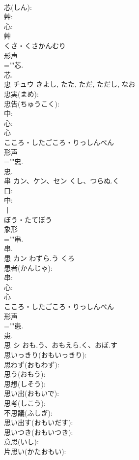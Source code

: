 \documentclass[8pt]{extreport}
\begin{document}
\begin{CJK}{UTF8}{min}
\\	芯(しん): 
\\	艸: 
\\	心: 
\\	艸	
\\	くさ・くさかんむり	
\\	形声 
\\	=""芯.
\\	芯.
\\	忠	チュウ		きよし, たた, ただ, ただし, なお	
\\	忠実(まめ): 
\\	忠告(ちゅうこく): 
\\	中: 
\\	心: 
\\	心	
\\	こころ・したごころ・りっしんべん	
\\	形声 
\\	=""忠.
\\	忠.
\\	串	カン、ケン、セン	くし、つらぬ.く		
\\	口: 
\\	中: 
\\	丨	
\\	ぼう・たてぼう	
\\	象形 
\\	=""串.
\\	串.
\\	患	カン	わずら.う	くろ	
\\	患者(かんじゃ): 
\\	串: 
\\	心: 
\\	心	
\\	こころ・したごころ・りっしんべん	
\\	形声 
\\	=""患.
\\	患.
\\	思	シ	おも.う、おもえら.く、おぼ.す		
\\	思いっきり(おもいっきり): 
\\	思わず(おもわず): 
\\	思う(おもう): 
\\	思想(しそう): 
\\	思い出(おもいで): 
\\	思考(しこう): 
\\	不思議(ふしぎ): 
\\	思い出す(おもいだす): 
\\	思いつき(おもいつき): 
\\	意思(いし): 
\\	片思い(かたおもい): 

\end{CJK}
\end{document}
